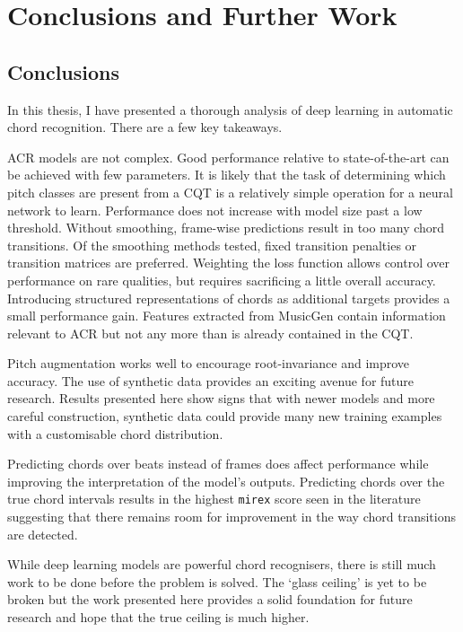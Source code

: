 
\chapter{Conclusions and Further Work}

\section{Conclusions}

In this thesis, I have presented a thorough analysis of deep learning in automatic chord recognition. There are a few key takeaways.

ACR models are not complex. Good performance relative to state-of-the-art can be achieved with few parameters. It is likely that the task of determining which pitch classes are present from a CQT is a relatively simple operation for a neural network to learn. Performance does not increase with model size past a low threshold. Without smoothing, frame-wise predictions result in too many chord transitions. Of the smoothing methods tested, fixed transition penalties or transition matrices are preferred. Weighting the loss function allows control over performance on rare qualities, but requires sacrificing a little overall accuracy. Introducing structured representations of chords as additional targets provides a small performance gain. Features extracted from MusicGen contain information relevant to ACR but not any more than is already contained in the CQT.

Pitch augmentation works well to encourage root-invariance and improve accuracy. The use of synthetic data provides an exciting avenue for future research. Results presented here show signs that with newer models and more careful construction, synthetic data could provide many new training examples with a customisable chord distribution.

Predicting chords over beats instead of frames does affect performance while improving the interpretation of the model's outputs. Predicting chords over the true chord intervals results in the highest \texttt{mirex} score seen in the literature suggesting that there remains room for improvement in the way chord transitions are detected.

While deep learning models are powerful chord recognisers, there is still much work to be done before the problem is solved. The `glass ceiling' is yet to be broken but the work presented here provides a solid foundation for future research and hope that the true ceiling is much higher.

